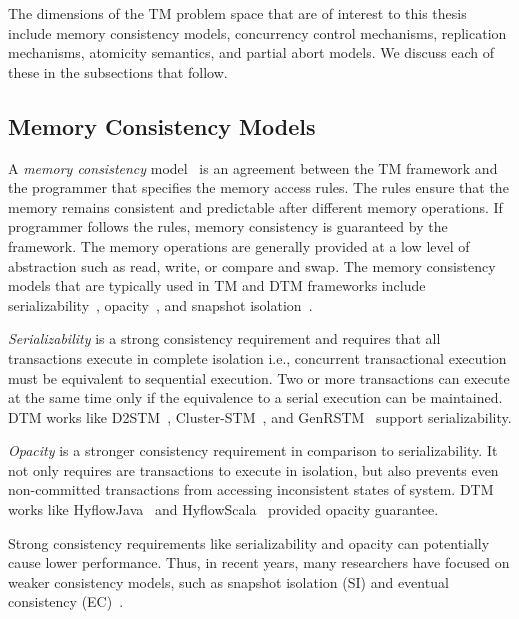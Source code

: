 \documentclass[12pt,english]{report}
\begin{document}
The dimensions of the TM problem space that are of interest to this thesis include memory consistency models, concurrency control mechanisms, replication mechanisms, atomicity semantics, and partial abort models. We discuss each of these in the subsections that follow. 

\subsection{Memory Consistency Models}

A \textit{memory consistency} model~\cite{MemoryConsistency546611} is an agreement between the TM framework and the programmer that specifies the memory access rules. The rules ensure that the memory remains consistent and predictable after different memory operations. If programmer follows the rules, memory consistency is guaranteed by the framework. The memory operations are generally provided at a low level of abstraction such as read, write, or compare and swap. 
The memory consistency models that are typically used in TM and DTM frameworks include serializability~\cite{serializabilityFormal}, opacity~\cite{Guerraoui:2008:CTM:1345206.1345233}, and snapshot isolation~\cite{SnapShot:Berenson:1995:CAS:223784.223785}.

\textit{Serializability} is a strong consistency requirement and requires that all transactions execute in  complete isolation i.e., concurrent transactional execution must be equivalent to sequential execution. Two or more transactions can execute at the same time only if the equivalence to a serial execution can be maintained. DTM works like D2STM~\cite{D2STM:5368778}, Cluster-STM~\cite{Bocchino:2008:STM:1345206.1345242}, and GenRSTM~\cite{GenRSTM:6038614} support serializability.

\textit{Opacity} is a stronger consistency requirement in comparison to serializability. It not only requires are transactions to execute in isolation, but also prevents even non-committed transactions from accessing inconsistent states of system. DTM works like HyflowJava~\cite{Saad:2011:HHP:1996130.1996167} and HyflowScala~\cite{turcuhyflow2} provided opacity guarantee.

Strong consistency requirements like serializability and opacity can potentially cause lower performance.  Thus, in recent years, many researchers have focused on weaker consistency models, such as snapshot isolation (SI) and eventual consistency (EC)~\cite{Eventual:Vogels:2009:EC:1435417.1435432}.
\end{document}
